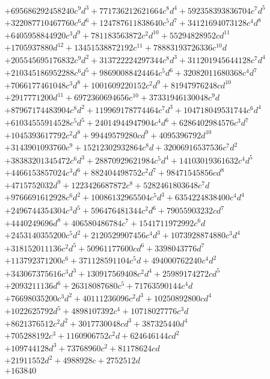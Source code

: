 {\begin{align*}
&+695686292458240c^{9}d^{3}+771736212621664c^{8}d^{4}+592358393836704c^{7}d^{5}\\
&+322087710467760c^{6}d^{6}+124787611838640c^{5}d^{7}+34121694073128c^{4}d^{8}\\
&+6405958844920c^{3}d^{9}+781183563872c^{2}d^{10}+55294828952cd^{11}\\
&+1705937880d^{12}+13451538872192c^{11}+78883193726336c^{10}d\\
&+205545695176832c^{9}d^{2}+313722224297344c^{8}d^{3}+311201945644128c^{7}d^{4}\\
&+210345186952288c^{6}d^{5}+98690088424464c^{5}d^{6}+32082011680368c^{4}d^{7}\\
&+7066177461048c^{3}d^{8}+1001609220152c^{2}d^{9}+81947976248cd^{10}\\
&+2917771200d^{11}+6972360694656c^{10}+37331946130048c^{9}d\\
&+87967174483904c^{8}d^{2}+119969178774464c^{7}d^{3}+104718049531744c^{6}d^{4}\\
&+61034555914528c^{5}d^{5}+24014944947904c^{4}d^{6}+6286402984576c^{3}d^{7}\\
&+1045393617792c^{2}d^{8}+99449579280cd^{9}+4095396792d^{10}\\
&+3143901093760c^{9}+15212302932864c^{8}d+32006916537536c^{7}d^{2}\\
&+38383201345472c^{6}d^{3}+28870929621984c^{5}d^{4}+14103019361632c^{4}d^{5}\\
&+4466153857024c^{3}d^{6}+882404498752c^{2}d^{7}+98471545856cd^{8}\\
&+4715752032d^{9}+1223426687872c^{8}+5282461803648c^{7}d\\
&+9766691612928c^{6}d^{2}+10086132965504c^{5}d^{3}+6354224838400c^{4}d^{4}\\
&+2496744354304c^{3}d^{5}+596476481344c^{2}d^{6}+79055903232cd^{7}\\
&+4440249696d^{8}+406580486784c^{7}+1541711972992c^{6}d\\
&+2453140355200c^{5}d^{2}+2120529907456c^{4}d^{3}+1073928874880c^{3}d^{4}\\
&+318152011136c^{2}d^{5}+50961177600cd^{6}+3398043776d^{7}\\
&+113792371200c^{6}+371128591104c^{5}d+494000762240c^{4}d^{2}\\
&+343067375616c^{3}d^{3}+130917569408c^{2}d^{4}+25989174272cd^{5}\\
&+2093211136d^{6}+26318087680c^{5}+71763590144c^{4}d\\
&+76698035200c^{3}d^{2}+40111236096c^{2}d^{3}+10250892800cd^{4}\\
&+1022625792d^{5}+4898107392c^{4}+10718027776c^{3}d\\
&+8621376512c^{2}d^{2}+3017730048cd^{3}+387325440d^{4}\\
&+705288192c^{3}+1160906752c^{2}d+624646144cd^{2}\\
&+109744128d^{3}+73768960c^{2}+81178624cd\\
&+21911552d^{2}+4988928c+2752512d\\
&+163840
\end{align*}
}


